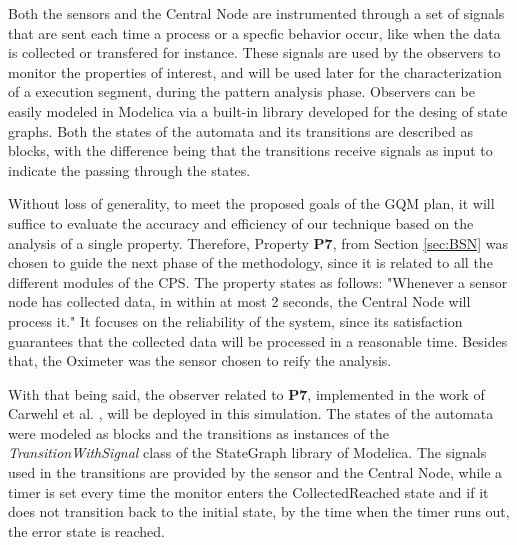 Both the sensors and the Central Node are instrumented through a set of signals that are sent each time a process or a specfic behavior occur, like when the data is collected or transfered for instance. These signals are used by the observers to monitor the properties of interest, and will be used later for the characterization of a execution segment, during the pattern analysis phase. Observers can be easily modeled in Modelica via a built-in library developed for the desing of state graphs. Both the states of the automata and its transitions are described as blocks, with the difference being that the transitions receive signals as input to indicate the passing through the states. 

Without loss of generality, to meet the proposed goals of the GQM plan, it will suffice to evaluate the accuracy and efficiency of our technique based on the analysis of a single property. Therefore, Property \textbf{P7}, from Section \ref{sec:BSN} was chosen to guide the next phase of the methodology, since it is related to all the different modules of the CPS. The property states as follows: "Whenever a sensor node has collected data, in within at most 2 seconds, the Central Node will process it." It focuses on the reliability of the system, since its satisfaction guarantees that the collected data will be processed in a reasonable time. Besides that, the Oximeter was the sensor chosen to reify the analysis. 

With that being said, the observer related to \textbf{P7}, implemented in the work of Carwehl et al. \cite{2022PSP}, will be deployed in this simulation. The states of the automata were modeled as blocks and the transitions as instances of the \textit{TransitionWithSignal} class of the StateGraph library of Modelica. The signals used in the transitions are provided by the sensor and the Central Node, while a timer is set every time the monitor enters the CollectedReached state  and if it does not transition back to the initial state, by the time when the timer runs out, the error state is reached. 



